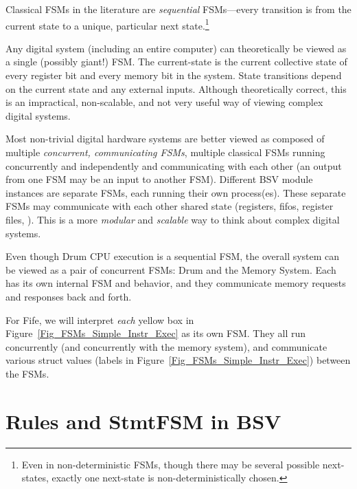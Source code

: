 Classical FSMs in the literature are \emph{sequential} FSMs---every
transition is from the current state to a unique, particular next
state.\footnote{Even in non-deterministic FSMs, though there may be
several possible next-states, exactly one next-state is
non-deterministically chosen.}

Any digital system (including an entire computer) can theoretically be
viewed as a single (possibly giant!) FSM.  The current-state is the
current collective state of every register bit and every memory bit in
the system.  State transitions depend on the current state and any
external inputs.  Although theoretically correct, this is an
impractical, non-scalable, and not very useful way of viewing complex
digital systems.

Most non-trivial digital hardware systems are better viewed as
composed of multiple \emph{concurrent, communicating FSMs}, {\ie}
multiple classical FSMs running concurrently and independently and
communicating with each other (an output from one FSM may be an input
to another FSM).  Different BSV module instances are separate FSMs,
each running their own process(es).  These separate FSMs may
communicate with each other {\via} shared state (registers, fifos,
register files, {\etc}).  This is a more \emph{modular} and
\emph{scalable} way to think about complex digital systems.


Even though Drum CPU execution is a sequential FSM, the overall system
can be viewed as a pair of concurrent FSMs: Drum and the Memory
System.  Each has its own internal FSM and behavior, and they
communicate memory requests and responses back and forth.


For Fife, we will interpret \emph{each} yellow box in
Figure~\ref{Fig_FSMs_Simple_Instr_Exec} as its own FSM.  They all run
concurrently (and concurrently with the memory system), and
communicate various struct values (labels in
Figure~\ref{Fig_FSMs_Simple_Instr_Exec}) between the FSMs.


\section{Rules and StmtFSM in BSV}

\label{Sec_Rules_StmtFSM}
\label{Sec_StmtFSM}

